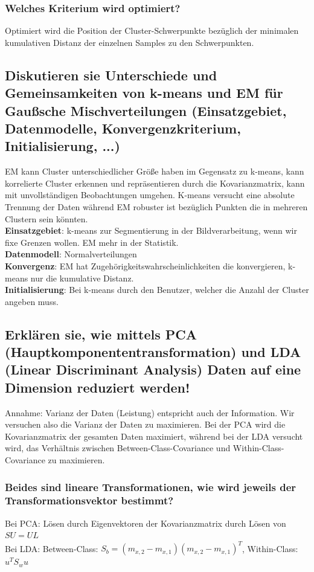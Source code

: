 \documentclass[12pt]{scrartcl}
\begin{document}
\subsubsection{Welches Kriterium wird optimiert?}
Optimiert wird die Position der Cluster-Schwerpunkte bezüglich der minimalen kumulativen Distanz der einzelnen Samples zu den Schwerpunkten.

\subsection{Diskutieren sie Unterschiede und Gemeinsamkeiten von k-means und EM für Gaußsche Mischverteilungen (Einsatzgebiet, Datenmodelle, Konvergenzkriterium, Initialisierung, ...)}
EM kann Cluster unterschiedlicher Größe haben im Gegensatz zu k-means, kann korrelierte Cluster erkennen und repräsentieren durch die Kovarianzmatrix, kann mit unvollständigen Beobachtungen umgehen.
K-means versucht eine absolute Trennung der Daten während EM robuster ist bezüglich Punkten die in mehreren Clustern sein könnten. \\
{\bf Einsatzgebiet}: k-means zur Segmentierung in der Bildverarbeitung, wenn wir fixe Grenzen wollen. EM mehr in der Statistik. \\
{\bf Datenmodell}: Normalverteilungen \\
{\bf Konvergenz}: EM hat Zugehörigkeitswahrscheinlichkeiten die konvergieren, k-means nur die kumulative Distanz. \\
{\bf Initialisierung}: Bei k-means durch den Benutzer, welcher die Anzahl der Cluster angeben muss.

\subsection{Erklären sie, wie mittels PCA (Hauptkomponententransformation) und LDA (Linear Discriminant Analysis) Daten auf eine Dimension reduziert werden!}
Annahme: Varianz der Daten (Leistung) entspricht auch der Information. Wir versuchen also die Varianz der Daten zu maximieren. Bei der PCA wird die Kovarianzmatrix der gesamten Daten maximiert, während bei der LDA versucht wird, das Verhältnis zwischen Between-Class-Covariance und Within-Class-Covariance zu maximieren.

\subsubsection{Beides sind lineare Transformationen, wie wird jeweils der Transformationsvektor bestimmt?}
Bei PCA: Lösen durch Eigenvektoren der Kovarianzmatrix durch Lösen von $SU=UL$ \\
Bei LDA: Between-Class: $S_b = (m_{x,2}-m_{x,1})(m_{x,2}-m_{x,1})^T$, Within-Class: $u^TS_wu$
\end{document}
